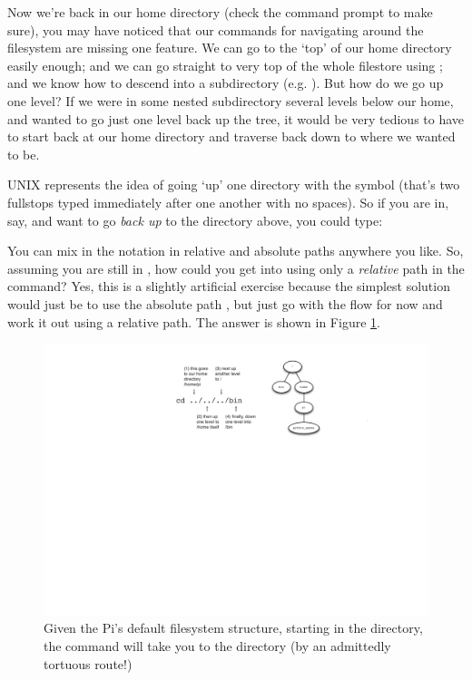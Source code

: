 Now we're back in our home directory (check the command prompt to make sure), you may have noticed that our commands for navigating around the filesystem are missing one feature. We can go to the `top' of our home directory easily enough; and we can go straight to very top of the whole filestore using ; and we know how to descend into a subdirectory (e.g. ). But how do we go up one level? If we were in some nested subdirectory several levels below our home, and wanted to go just one level back up the tree, it would be very tedious to have to start back at our home directory and traverse back down to where we wanted to be. 

UNIX represents the idea of going `up' one directory with the  symbol (that's two fullstops typed immediately after one another with no spaces). So if you are in, say,  and want to go \textit{back up} to the directory above, you could type:


You can mix in the  notation in relative and absolute paths anywhere you like. So, assuming you are still in , how could you get into  using only a \textit{relative} path in the  command? Yes, this is a slightly artificial exercise because the simplest solution would just be to use the absolute path , but just go with the flow for now and work it out using a relative path. The answer is shown in Figure \ref{figure:simple-navigation}. 

\begin{figure}[t]
\centerline{\includegraphics[width=13.5cm]{images/simple-navigation}}
\caption{Given the Pi's default filesystem structure, starting in the  directory, the command  will take you to the  directory (by an admittedly tortuous route!)}\label{figure:simple-navigation}
\end{figure}


